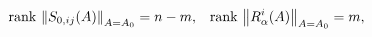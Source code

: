 \begin{equation}
\mathrm{rank\,}\left\| S_{0,ij}(A)\right\| _{A=A_{0}}=n-m,\;\;\;\mathrm{%
rank\,}\left\| R_{\alpha }^{i}(A)\right\| _{A=A_{0}}=m,  \label{rank}
\end{equation}


